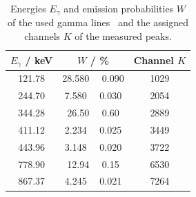 \begin{table}[H]
	\centering
	\caption{Energies $E_\gamma$ and emission probabilities $W$ of the used  gamma lines~\cite{eu152} and the assigned channels $K$ of the measured peaks.}
	\label{tab:Euspec}
	\begin{tabular}{c  c  c}
		\toprule
		$E_\gamma$ / keV & $W$ / \% & Channel $K$\\
		\midrule
		121.78 & 28.580  \, \clap{$\pm$} \,  0.090 & 1029 \\
		 244.70 & 7.580  \, \clap{$\pm$} \,  0.030 & 2054 \\
		 344.28 & 26.50  \, \clap{$\pm$} \,  0.60 & 2889 \\
		 411.12 & 2.234  \, \clap{$\pm$} \,  0.025 & 3449 \\
		 443.96 & 3.148  \, \clap{$\pm$} \,  0.020 & 3722 \\
		 778.90 & 12.94  \, \clap{$\pm$} \,  0.15 & 6530 \\
		 867.37 & 4.245  \, \clap{$\pm$} \,  0.021 & 7264 \\
		 \bottomrule
	\end{tabular}
\end{table}
